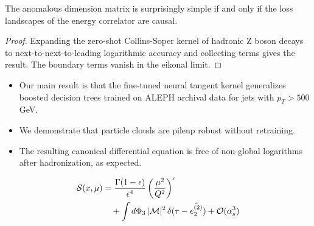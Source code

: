 \begin{theorem}[Finiteness]\label{thm:3}
The anomalous dimension matrix is surprisingly simple if and only if the
loss landscapes of the energy correlator are causal.
\end{theorem}

\begin{proof}
Expanding the zero-shot Collins-Soper kernel of hadronic Z boson decays
to next-to-next-to-leading logarithmic accuracy and collecting terms
gives the result. The boundary terms vanish in the eikonal limit.
\end{proof}

\begin{itemize}
  \item Our main result is that the fine-tuned neural tangent kernel generalizes boosted decision trees trained on ALEPH archival data for jets with $p_T > 500$ GeV.
  \item We demonstrate that particle clouds are pileup robust without retraining.
  \item The resulting canonical differential equation is free of non-global logarithms after hadronization, as expected.
\end{itemize}

\begin{align}
  \mathcal{S}(x, \mu) &= \frac{\Gamma(1-\epsilon)}{\epsilon^{4}} \left(\frac{\mu^2}{Q^2}\right)^{\epsilon} \nonumber \\
  &\quad + \int d\Phi_{3} \, |\mathcal{M}|^2 \, \delta(\tau - \hat{e_2^{(2)}}) + \mathcal{O}(\alpha_s^3) \label{eq:4}
\end{align}

